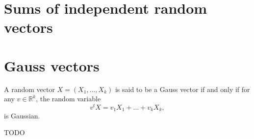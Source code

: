\section{Sums of independent random vectors}%
\label{sec:Sums of independent random vectors}

\section{Gauss vectors}%
\label{sec:Gauss vectors}
\begin{definition}
    \label{def:11.6}
    A random vector $X=(X_1, \ldots, X_k)$ is said to be a Gauss vector if and only if for any 
    $v \in \mathbb{R}^{k}$, the random variable
    \[
    v^{t}X = v_1X_1 + \ldots + v_kX_k,
    \]
    is Gaussian.
\end{definition}

\begin{remark}[]
    \label{rem:11.11}
    TODO
\end{remark}

